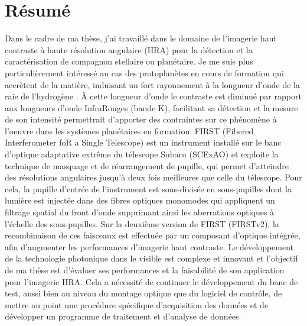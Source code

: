 
\newpage
\thispagestyle{empty}
\chapter*{Résumé}

Dans le cadre de ma thèse, j'ai travaillé dans le domaine de l'imagerie haut contraste à haute résolution angulaire (HRA) pour la détection et la caractérisation de compagnon stellaire ou planétaire. Je me suis plus particulièrement intéressé au cas des protoplanètes en cours de formation qui accrètent de la matière, induisant un fort rayonnement à la longueur d'onde de la raie de l'hydrogène \ha. À cette longueur d'onde le contraste est diminué par rapport aux longueurs d'onde InfraRouges (bande K), facilitant sa détection et la mesure de son intensité permettrait d'apporter des contraintes sur ce phénomène à l'oeuvre dans les systèmes planétaires en formation. FIRST (Fibered Interferometer foR a Single Telescope) est un instrument installé sur le banc d'optique adaptative extrême du télescope Subaru (SCExAO) et exploite la technique de masquage et de réarrangement de pupille, qui permet d'atteindre des résolutions angulaires jusqu'à deux fois meilleures que celle du télescope. Pour cela, la pupille d'entrée de l'instrument est sous-divisée en sous-pupilles dont la lumière est injectée dans des fibres optiques monomodes qui appliquent un filtrage spatial du front d'onde supprimant ainsi les aberrations optiques à l'échelle des sous-pupilles. Sur la deuxième version de FIRST (FIRSTv2), la recombinaison de ces faisceaux est effectuée par un composant d'optique intégrée, afin d'augmenter les performances d'imagerie haut contraste. Le développement de la technologie photonique dans le visible est complexe et innovant et l'objectif de ma thèse est d'évaluer ses performances et la faisabilité de son application pour l'imagerie HRA. Cela a nécessité de continuer le développement du banc de test, aussi bien au niveau du montage optique que du logiciel de contrôle, de mettre au point une procédure spécifique d'acquisition des données et de développer un programme de traitement et d'analyse de données.

